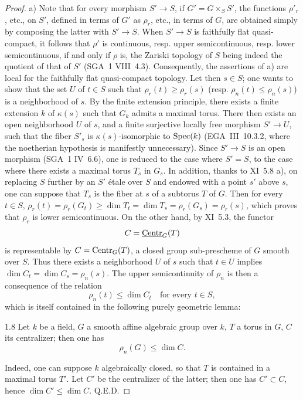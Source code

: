 \begin{proof}
a) Note that for every morphism $S'\to S$, if $G'=G\times_S S'$, the functions $\rho'_r$, etc., on $S'$, defined in terms of $G'$ as $\rho_r$, etc., in terms of $G$, are obtained simply by composing the latter with $S'\to S$. When $S'\to S$ is faithfully flat quasi-compact, it follows that $\rho'$ is continuous, resp. upper semicontinuous, resp. lower semicontinuous, if and only if $\rho$ is, the Zariski topology of $S$ being indeed the quotient of that of $S'$ (SGA~1 VIII~4.3). Consequently, the assertions of a) are local for the faithfully flat quasi-compact topology. Let then $s\in S$; one wants to show that the set $U$ of $t\in S$ such that $\rho_r(t)\ge\rho_r(s)$ (resp. $\rho_n(t)\le\rho_n(s)$) is a neighborhood of $s$. By the finite extension principle, there exists a finite extension $k$ of $\kappa(s)$ such that $G_k$ admits a maximal torus. There then exists an open neighborhood $U$ of $s$, and a finite surjective locally free morphism $S'\to U$, such that the fiber $S'_s$ is $\kappa(s)$-isomorphic to $\operatorname{Spec}(k)$ (\cf EGA~III~10.3.2, where the noetherian hypothesis is manifestly unnecessary). Since $S'\to S$ is an open morphism (SGA~1 IV~6.6), one is reduced to the case where $S'=S$, \ie to the case where there exists a maximal torus $T_s$ in $G_s$. In addition, thanks to XI~5.8 a), on replacing $S$ further by an $S'$ étale over $S$ and endowed with a point $s'$ above $s$, one can suppose that $T_s$ is the fiber at $s$ of a subtorus $T$ of $G$. Then for every $t\in S$, $\rho_r(t)=\rho_r(G_t)\ge\dim T_t=\dim T_s=\rho_r(G_s)=\rho_r(s)$, which proves that $\rho_r$ is lower semicontinuous. On the other hand, by XI~5.3, the functor
\[
C=\underline{\mathrm{Centr}}_G(T)
\]
is representable by $C=\operatorname{Centr}_G(T)$, a closed group sub-prescheme of $G$ smooth over $S$. Thus there exists a neighborhood $U$ of $s$ such that $t\in U$ implies $\dim C_t=\dim C_s=\rho_n(s)$. The upper semicontinuity of $\rho_n$ is then a consequence of the relation
\[
\rho_n(t)\le\dim C_t\quad\text{for every }t\in S,
\]
which is itself contained in the following purely geometric lemma:
\begin{lemma}{1.8}\label{XII.1.8}
Let $k$ be a field, $G$ a smooth affine algebraic group over $k$, $T$ a torus in $G$, $C$ its centralizer; then one has
\[
\rho_n(G)\le\dim C.
\]
\end{lemma}
Indeed, one can suppose $k$ algebraically closed, so that $T$ is contained in a maximal torus $T'$. Let $C'$ be the centralizer of the latter; then one has $C'\subset C$, hence $\dim C'\le\dim C$. \hfill Q.E.D.


\end{proof}
